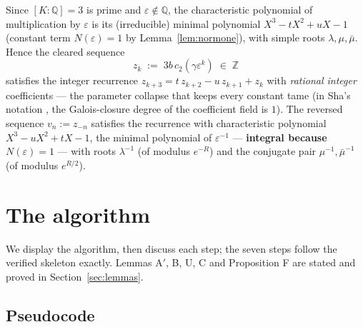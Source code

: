 \documentclass[11pt]{amsart}
\theoremstyle{plain}
\theoremstyle{remark}
\begin{document}
Since $[K:\mathbb{Q}] = 3$ is prime and
$\varepsilon \notin \mathbb{Q}$, the characteristic polynomial of
multiplication by $\varepsilon$ is its (irreducible) minimal
polynomial $X^3 - tX^2 + uX - 1$ (constant term $N(\varepsilon) = 1$
by Lemma~\ref{lem:normone}), with simple roots $\lambda, \mu, \bar\mu$.
Hence the cleared sequence
\[
z_k \;:=\; 3b\,c_2(\gamma\varepsilon^k) \;\in\; \mathbb{Z}
\]
satisfies the integer recurrence $z_{k+3} = t\,z_{k+2} - u\,z_{k+1} +
z_k$ with \emph{rational integer} coefficients --- the parameter
collapse that keeps every constant tame (in Sha's notation
\cite{Sha19}, the Galois-closure degree of the coefficient field is
$1$). The reversed sequence $v_n := z_{-n}$ satisfies the recurrence
with characteristic polynomial $X^3 - uX^2 + tX - 1$, the minimal
polynomial of $\varepsilon^{-1}$ --- \textbf{integral because
$N(\varepsilon) = 1$} --- with roots $\lambda^{-1}$ (of modulus
$e^{-R}$) and the conjugate pair $\mu^{-1}, \bar\mu^{-1}$ (of modulus
$e^{R/2}$).

\section{The algorithm}\label{sec:algorithm}

We display the algorithm, then discuss each step; the seven steps
follow the verified skeleton exactly. Lemmas A$'$, B, U, C and
Proposition F are stated and proved in Section~\ref{sec:lemmas}.

\subsection{Pseudocode}\label{sec:pseudocode}
\end{document}
